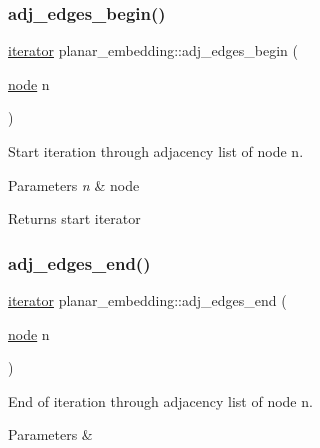 \subsubsection{\texorpdfstring{adj\+\_\+edges\+\_\+begin()}{adj\_edges\_begin()}}
{\footnotesize\ttfamily \mbox{\hyperlink{structsymlist__iterator}{iterator}} planar\+\_\+embedding\+::adj\+\_\+edges\+\_\+begin (\begin{DoxyParamCaption}\item[{\mbox{\hyperlink{classnode}{node}}}]{n }\end{DoxyParamCaption})\hspace{0.3cm}{\ttfamily [inline]}}

Start iteration through adjacency list of node {\ttfamily n}.


\begin{DoxyParams}{Parameters}
{\em n} & node\\
\hline
\end{DoxyParams}
\begin{DoxyReturn}{Returns}
start iterator 
\end{DoxyReturn}
\mbox{\label{classplanar__embedding_a1345ee93995019d81cc78fb2806acc88}} 
\subsubsection{\texorpdfstring{adj\+\_\+edges\+\_\+end()}{adj\_edges\_end()}}
{\footnotesize\ttfamily \mbox{\hyperlink{structsymlist__iterator}{iterator}} planar\+\_\+embedding\+::adj\+\_\+edges\+\_\+end (\begin{DoxyParamCaption}\item[{\mbox{\hyperlink{classnode}{node}}}]{n }\end{DoxyParamCaption})\hspace{0.3cm}{\ttfamily [inline]}}

End of iteration through adjacency list of node {\ttfamily n}.


\begin{DoxyParams}{Parameters}
{\em } & \\
\hline
\end{DoxyParams}
\mbox{\label{classplanar__embedding_a151a1e7cf6cfbbd0a09c467ec8bc61d1}} 
